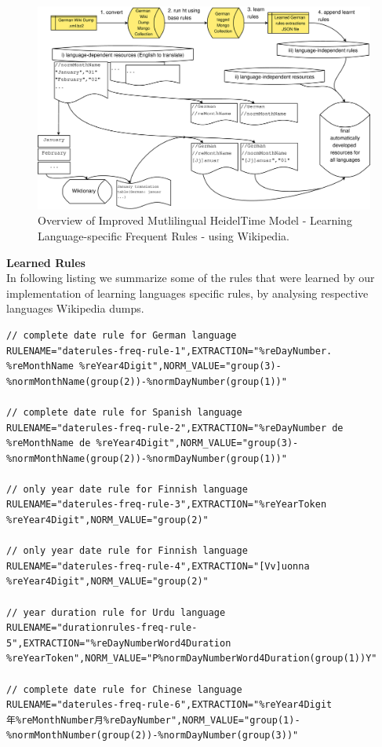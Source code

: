 \begin{figure}[H] 
	\centering
	\includegraphics[width=14cm]{Graphics/ht-multilingual-new-3}
	\caption{Overview of Improved Mutlilingual HeidelTime Model - Learning Language-specific Frequent Rules - using Wikipedia.}
	\label{figure:4d}
\end{figure}

\textbf{Learned Rules}\\
In following listing we summarize some of the rules that were learned by our implementation of learning languages specific rules, by analysing respective languages Wikipedia dumps.  \\

\begin{minipage}{\linewidth}
\begin{lstlisting}
// complete date rule for German language
RULENAME="daterules-freq-rule-1",EXTRACTION="%reDayNumber. %reMonthName %reYear4Digit",NORM_VALUE="group(3)-%normMonthName(group(2))-%normDayNumber(group(1))"

// complete date rule for Spanish language
RULENAME="daterules-freq-rule-2",EXTRACTION="%reDayNumber de %reMonthName de %reYear4Digit",NORM_VALUE="group(3)-%normMonthName(group(2))-%normDayNumber(group(1))"

// only year date rule for Finnish language
RULENAME="daterules-freq-rule-3",EXTRACTION="%reYearToken %reYear4Digit",NORM_VALUE="group(2)"

// only year date rule for Finnish language
RULENAME="daterules-freq-rule-4",EXTRACTION="[Vv]uonna %reYear4Digit",NORM_VALUE="group(2)"

// year duration rule for Urdu language 
RULENAME="durationrules-freq-rule-5",EXTRACTION="%reDayNumberWord4Duration %reYearToken",NORM_VALUE="P%normDayNumberWord4Duration(group(1))Y"

// complete date rule for Chinese language
RULENAME="daterules-freq-rule-6",EXTRACTION="%reYear4Digit年%reMonthNumber月%reDayNumber",NORM_VALUE="group(1)-%normMonthNumber(group(2))-%normDayNumber(group(3))"

\end{lstlisting}
\end{minipage}

